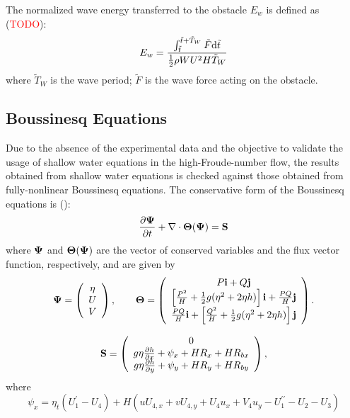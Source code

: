 \documentclass{jfm}
\begin{document}
The normalized wave energy transferred to the obstacle $E_w$ is defined as (\textcolor{Red}{TODO}):
\begin{equation}
	E_w=\frac{\int_{\tilde{t}}^{\tilde{t}+\tilde{T}_W} \tilde{F} {\rm{d}}\tilde{t}}{\frac{1}{2}\rho W U^2 H \tilde{T}_W}
	\label{wave_energy}
\end{equation}
where $\tilde{T}_W$ is the wave period; $\tilde{F}$ is the wave force acting on the obstacle.

\subsection{Boussinesq Equations}
Due to the absence of the experimental data and the objective to validate the usage of shallow water equations in the high-Froude-number flow, the results obtained from shallow water equations is checked against those obtained from fully-nonlinear Boussinesq equations. The conservative form of the Boussinesq equations is (\cite{Shietal2012}):
\begin{equation}
\frac{\partial {\bf \Psi}}{\partial t} + \nabla \cdot {\bf \Theta}({\bf \Psi}) = {\bf S}
\label{tvd}
\end{equation}
where ${\bf \Psi}$ and ${\bf \Theta} ({\bf \Psi})$ are  the vector of conserved variables and  the flux vector function, respectively, and are given by
\begin{equation}
{\bf \Psi} = \left( \begin{array}{c} \eta \\
	U \\
	V \end{array} \right) ,
\ \ \ \  \ \  {\bf \Theta} = \left( \begin{array}{c}
	P {\bf i} + Q {\bf j} \\
	\left[\frac{P^2}{H} +\frac{1}{2}g (\eta^2 + 2 \eta h) \right ] {\bf i} + \frac{P Q}{H} {\bf j} \\
	\frac{P Q}{H} {\bf i} + \left[\frac{Q^2}{H} +\frac{1}{2} g (\eta^2 + 2\eta h) \right] {\bf j} 
\end{array}
\right) .
\end{equation}

\begin{equation}
{\bf S} = \left( \begin{array}{c} 
	0\\
	g \eta \frac{\partial h}{\partial x}  +\psi_x + H R_x+HR_{bx}  \\
	g \eta \frac{\partial h}{\partial y} + \psi_y + H R_y+HR_{by}
\end{array}
\right) ,
\end{equation}
where 
\begin{equation}
\psi_x =  \eta_t (U_1^{\prime}-U_4) + H \left( u U_{4,x} + v U_{4,y} + U_4 u_x +V_4 u_y  - U_1^{\prime \prime}-  U_2 -  U_3 \right) 
\end{equation}
\end{document}

